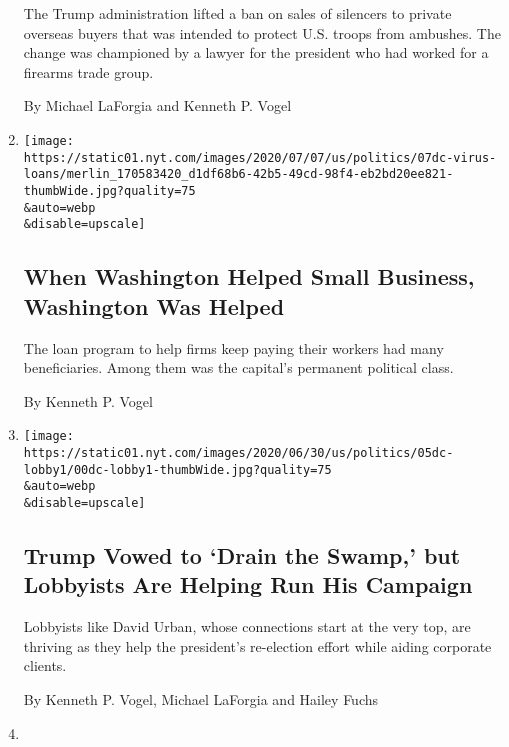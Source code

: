 \begin{enumerate}
  The Trump administration lifted a ban on sales of silencers to private
  overseas buyers that was intended to protect U.S. troops from
  ambushes. The change was championed by a lawyer for the president who
  had worked for a firearms trade group.

  By Michael LaForgia and Kenneth P. Vogel
\item
  \href{/2020/07/07/us/politics/small-business-loans-lobbyists-political-consultants.html}{}

  \texttt{[image: https://static01.nyt.com/images/2020/07/07/us/politics/07dc-virus-loans/merlin\_170583420\_d1df68b6-42b5-49cd-98f4-eb2bd20ee821-thumbWide.jpg?quality=75\\\&auto=webp\\\&disable=upscale]}

  \hypertarget{when-washington-helped-small-business-washington-was-helped}{%
  \subsection{When Washington Helped Small Business, Washington Was
  Helped}\label{when-washington-helped-small-business-washington-was-helped}}

  The loan program to help firms keep paying their workers had many
  beneficiaries. Among them was the capital's permanent political class.

  By Kenneth P. Vogel
\item
  \href{/2020/07/06/us/politics/trump-lobbyists-swamp-campaign.html}{}

  \texttt{[image: https://static01.nyt.com/images/2020/06/30/us/politics/05dc-lobby1/00dc-lobby1-thumbWide.jpg?quality=75\\\&auto=webp\\\&disable=upscale]}

  \hypertarget{trump-vowed-to-drain-the-swamp-but-lobbyists-are-helping-run-his-campaign}{%
  \subsection{Trump Vowed to `Drain the Swamp,' but Lobbyists Are
  Helping Run His
  Campaign}\label{trump-vowed-to-drain-the-swamp-but-lobbyists-are-helping-run-his-campaign}}

  Lobbyists like David Urban, whose connections start at the very top,
  are thriving as they help the president's re-election effort while
  aiding corporate clients.

  By Kenneth P. Vogel, Michael LaForgia and Hailey Fuchs
\item
  \href{/2020/07/05/us/politics/prince-andrew-jeffrey-epstein.html}{}


\end{enumerate}
